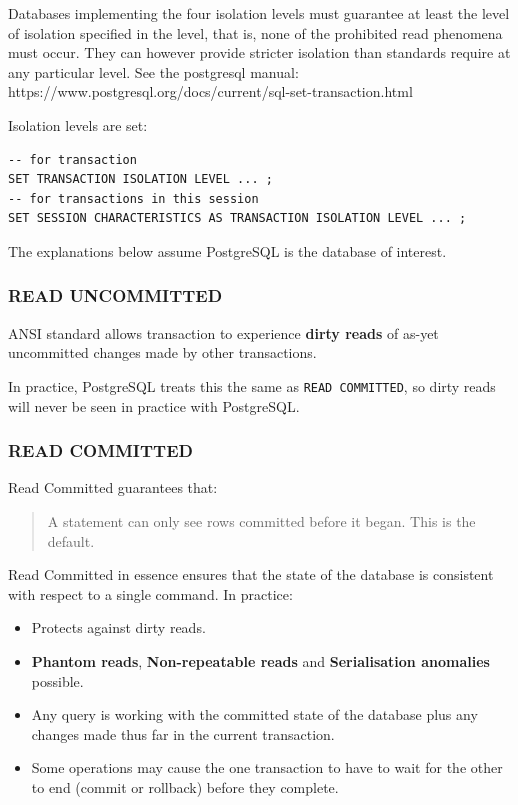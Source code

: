 \documentclass{pgnotes}
\begin{document}
Databases implementing the four isolation levels must guarantee at least the level of isolation specified in the level, that is, none of the prohibited read phenomena must occur.
They can however provide stricter isolation than standards require at any particular level.
See the postgresql manual:\\
https://www.postgresql.org/docs/current/sql-set-transaction.html

Isolation levels are set:
\begin{verbatim}
-- for transaction 
SET TRANSACTION ISOLATION LEVEL ... ;
-- for transactions in this session
SET SESSION CHARACTERISTICS AS TRANSACTION ISOLATION LEVEL ... ; 
\end{verbatim}
The explanations below assume PostgreSQL is the database of interest.


\subsubsection{READ UNCOMMITTED}

ANSI standard allows transaction to experience \textbf{dirty reads} of as-yet uncommitted changes made by other transactions.

In practice, PostgreSQL treats this the same as \texttt{READ COMMITTED}, so dirty reads will never be seen in practice with PostgreSQL.



\subsubsection{READ COMMITTED}

Read Committed guarantees that:
\begin{quotation}
  A statement can only see rows committed before it began. This is the default.
\end{quotation}
Read Committed in essence ensures that the state of the database is consistent with respect to a single command. 
In practice:
\begin{itemize}
\item Protects against dirty reads.
\item \textbf{Phantom reads}, \textbf{Non-repeatable reads} and \textbf{Serialisation anomalies}  possible.
\item Any query is working with the committed state of the database plus any changes made thus far in the current transaction.
\item Some operations may cause the one transaction to have to wait for the other to end (commit or rollback) before they complete.
\end{itemize}
\end{document}
